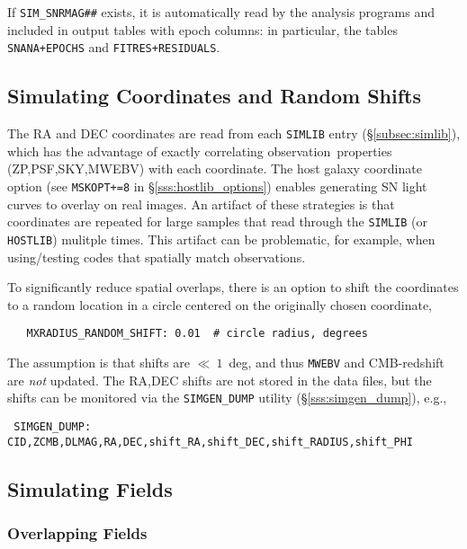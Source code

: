 \documentclass[12pt]{article}
\newcommand{\obs}{observation}
\newcommand{\obss}{observations}
\begin{document}
{If {\tt SIM\_SNRMAG\#\#} exists, it is automatically read
by the analysis programs and included in output tables with epoch columns:
in particular, the tables {\tt SNANA+EPOCHS} and {\tt FITRES+RESIDUALS}.


 \subsection{Simulating Coordinates and Random Shifts}
 \label{subsec:simCoords}

The RA and DEC coordinates are read from each {\tt SIMLIB} entry  
(\S\ref{subsec:simlib}), which has the advantage of exactly correlating
\obs\ properties (ZP,PSF,SKY,MWEBV) with each coordinate.
The host galaxy coordinate option
(see {\tt MSKOPT+=8} in \S\ref{sss:hostlib_options})
enables generating SN light curves to overlay on real images.
An artifact of these strategies is that coordinates are repeated
for large samples that read through the {\tt SIMLIB} (or {\tt HOSTLIB})
mulitple times. This artifact can be problematic, for example,
when using/testing codes that spatially match \obss.

To significantly reduce spatial overlaps, there is an option to shift
the coordinates to a random location in a circle centered on the originally
chosen coordinate,
\begin{verbatim}
   MXRADIUS_RANDOM_SHIFT: 0.01  # circle radius, degrees
\end{verbatim}  
The assumption is that shifts are $\ll~1$~deg, and thus
{\tt MWEBV} and CMB-redshift are {\it not} updated. 
The RA,DEC shifts are not stored in the data files, but the shifts
can be monitored via the {\tt SIMGEN\_DUMP} utility
(\S\ref{sss:simgen_dump}), e.g.,
\begin{verbatim}
 SIMGEN_DUMP: CID,ZCMB,DLMAG,RA,DEC,shift_RA,shift_DEC,shift_RADIUS,shift_PHI
\end{verbatim}  


 \subsection{Simulating Fields}
 \label{subsec:simFields}

 \subsubsection{Overlapping Fields}
 \label{sss:overlap}

}
\end{document}
